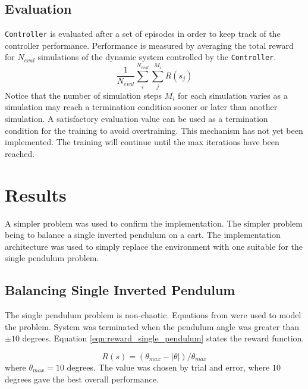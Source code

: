 \documentclass{LTHtwocol} %
\begin{document}
\subsection{Evaluation}
\texttt{Controller} is evaluated after a set of episodes in order to keep track of the controller performance.
Performance is measured by averaging the total reward for $N_{eval}$ simulations of the dynamic system controlled by the \texttt{Controller}.
\begin{equation}
	\label{eqn:evaluation_equation}
	\frac{1}{N_{eval}} \sum_i^{N_{eval}} \sum_j^{M_i} R(s_j)
\end{equation}
Notice that the number of simulation steps $M_i$ for each simulation varies as a simulation may reach a termination condition sooner or later than another simulation.
A satisfactory evaluation value can be used as a termination condition for the training to avoid overtraining.
This mechanism has not yet been implemented.
The training will continue until the max iterations have been reached.



\section{Results}
A simpler problem was used to confirm the implementation.
The simpler problem being to balance a single inverted pendulum on a cart.
The implementation architecture was used to simply replace the environment with one suitable for the single pendulum problem.

\subsection{Balancing Single Inverted Pendulum}
The single pendulum problem is non-chaotic.
Equations from \cite{Correct_Equations} were used to model the problem.
System was terminated when the pendulum angle was greater than $\pm 10$ degrees.
Equation \eqref{eqn:reward_single_pendulum} states the reward function.

\begin{equation}
    \label{eqn:reward_single_pendulum}
    R(s) = (\theta_{max} - |\theta|)/ \theta_{max}
\end{equation}
where $\theta_{max} = 10$ degrees.
The value was chosen by trial and error, where $10$ degrees gave the best overall performance.
\end{document}
